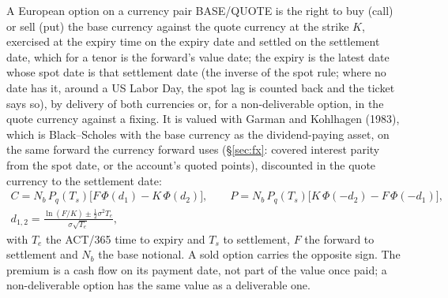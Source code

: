 \documentclass[11pt,a4paper]{article}
\begin{document}
A European option on a currency pair BASE/QUOTE is the right to buy (call) or sell (put) the base currency against the quote currency at the strike $K$, exercised at the expiry time on the expiry date and settled on the settlement date, which for a tenor is the forward's value date; the expiry is the latest date whose spot date is that settlement date (the inverse of the spot rule; where no date has it, around a US Labor Day, the spot lag is counted back and the ticket says so), by delivery of both currencies or, for a non-deliverable option, in the quote currency against a fixing. It is valued with Garman and Kohlhagen (1983), which is Black--Scholes with the base currency as the dividend-paying asset, on the same forward the currency forward uses (\S\ref{sec:fx}: covered interest parity from the spot date, or the account's quoted points), discounted in the quote currency to the settlement date:
\begin{equation}
\begin{gathered}
C = N_b\,P_q(T_s)\big[F\,\Phi(d_1)-K\,\Phi(d_2)\big],\qquad P = N_b\,P_q(T_s)\big[K\,\Phi(-d_2)-F\,\Phi(-d_1)\big],\\
d_{1,2}=\frac{\ln(F/K)\pm\tfrac12\sigma^2T_e}{\sigma\sqrt{T_e}},
\end{gathered}
\end{equation}
with $T_e$ the ACT/365 time to expiry and $T_s$ to settlement, $F$ the forward to settlement and $N_b$ the base notional. A sold option carries the opposite sign. The premium is a cash flow on its payment date, not part of the value once paid; a non-deliverable option has the same value as a deliverable one.
\end{document}
